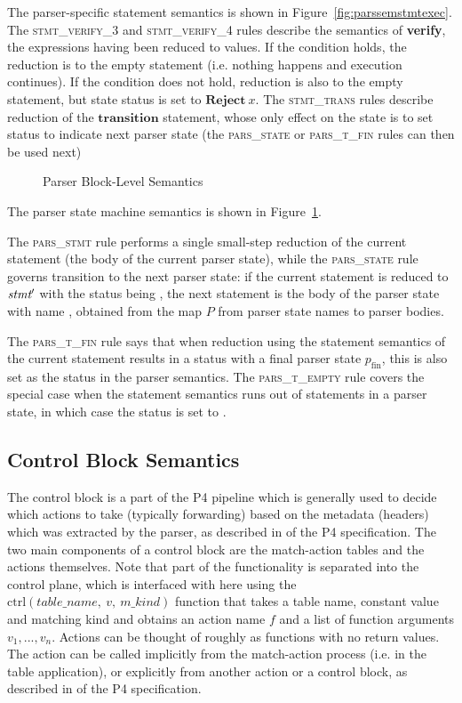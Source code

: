 \documentclass[UTF8]{article}
\begin{document}
The parser-specific statement semantics is shown in Figure~\ref{fig:parssemstmtexec}. The \textsc{stmt\_verify\_3} and \textsc{stmt\_verify\_4} rules describe the semantics of \textbf{verify}, the expressions having been reduced to values. If the condition holds, the reduction is to the empty statement (i.e. nothing happens and execution continues). If the condition does not hold, reduction is also to the empty statement, but state status is set to $\mathbf{Reject}\ x$. The \textsc{stmt\_trans} rules describe reduction of the $\mathbf{transition}$ statement, whose only effect on the state is to set status to indicate next parser state (the \textsc{pars\_state} or \textsc{pars\_t\_fin} rules can then be used next)

\begin{figure}[ht!]
\ottdefnsparsXXsem
\caption{Parser Block-Level Semantics}
\label{fig:semparsexec}
\end{figure}

The parser state machine semantics is shown in Figure~\ref{fig:semparsexec}.

The \textsc{pars\_stmt} rule performs a single small-step reduction of the current statement (the body of the current parser state), while the \textsc{pars\_state} rule governs transition to the next parser state: if the current statement \stmt{} is reduced to $\textit{stmt}{}'$ with the status being \trans{\vn{}}, the next statement is the body of the parser state with name \vn{}, obtained from the map $P$ from parser state names to parser bodies.

The \textsc{pars\_t\_fin} rule says that when reduction using the statement semantics of the current statement results in a status with a final parser state $p_{\mathrm{fin}}$, this is also set as the status in the parser semantics. The \textsc{pars\_t\_empty} rule covers the special case when the statement semantics runs out of statements in a parser state, in which case the status is set to .

\subsection{Control Block Semantics}
The control block is a part of the P4 pipeline which is generally used to decide which actions to take (typically forwarding) based on the metadata (headers) which was extracted by the parser, as described in  of the P4 specification. The two main components of a control block are the match-action tables and the actions themselves. Note that part of the functionality is separated into the control plane, which is interfaced with here using the $\mathrm{ctrl}(table\_name,\ v,\ m\_kind)$ function that takes a table name, constant value and matching kind and obtains an action name $f$ and a list of function arguments ${v_1}, ..., {v_n}$.
Actions can be thought of roughly as functions with no return values. The action can be called implicitly from the match-action process (i.e. in the table application), or explicitly from another action or a control block, as described in  of the P4 specification.
\end{document}
